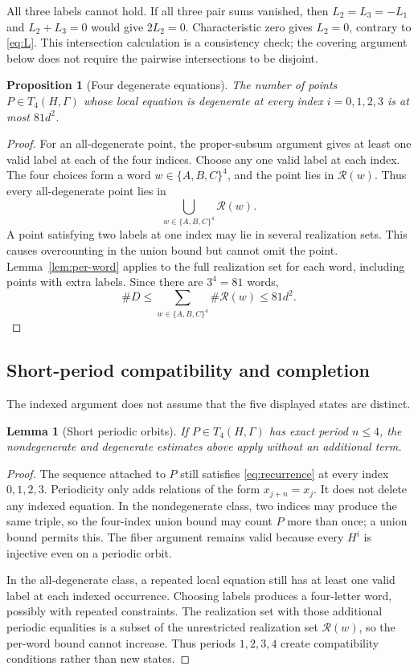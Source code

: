 \documentclass[11pt]{article}
\newtheorem{proposition}[theorem]{Proposition}
\newtheorem{lemma}[theorem]{Lemma}
\theoremstyle{definition}
\theoremstyle{remark}
\begin{document}
All three labels cannot hold.  If all three pair sums vanished, then
\(L_2=L_3=-L_1\) and \(L_2+L_3=0\) would give \(2L_2=0\).  Characteristic
zero gives \(L_2=0\), contrary to \eqref{eq:L}.  This intersection
calculation is a consistency check; the covering argument below does not
require the pairwise intersections to be disjoint.

\begin{proposition}[Four degenerate equations]\label{prop:degenerate}
The number of points \(P\in T_4(H,\Gamma)\) whose local equation is
degenerate at every index \(i=0,1,2,3\) is at most \(81d^2\).
\end{proposition}

\begin{proof}
For an all-degenerate point, the proper-subsum argument gives at least one
valid label at each of the four indices.  Choose any one valid label at each
index.  The four choices form a word \(w\in\{A,B,C\}^4\), and the point lies
in \(\mathcal R(w)\).  Thus every all-degenerate point lies in
\[
 \bigcup_{w\in\{A,B,C\}^4}\mathcal R(w).
\]
A point satisfying two labels at one index may lie in several realization
sets.  This causes overcounting in the union bound but cannot omit the point.
Lemma~\ref{lem:per-word} applies to the full realization set for each word,
including points with extra labels.  Since there are \(3^4=81\) words,
\[
 \#D
 \le
 \sum_{w\in\{A,B,C\}^4}\#\mathcal R(w)
 \le81d^2.
\]
\end{proof}

\subsection{Short-period compatibility and completion}

The indexed argument does not assume that the five displayed states are
distinct.

\begin{lemma}[Short periodic orbits]\label{lem:short-periods}
If \(P\in T_4(H,\Gamma)\) has exact period \(n\le4\), the nondegenerate and
degenerate estimates above apply without an additional term.
\end{lemma}

\begin{proof}
The sequence attached to \(P\) still satisfies
\eqref{eq:recurrence} at every index \(0,1,2,3\).  Periodicity only adds
relations of the form \(x_{j+n}=x_j\).  It does not delete any indexed
equation.  In the nondegenerate class, two indices may produce the same
triple, so the four-index union bound may count \(P\) more than once; a union
bound permits this.  The fiber argument remains valid because every
\(H^i\) is injective even on a periodic orbit.

In the all-degenerate class, a repeated local equation still has at least
one valid label at each indexed occurrence.  Choosing labels produces a
four-letter word, possibly with repeated constraints.  The realization set
with those additional periodic equalities is a subset of the unrestricted
realization set \(\mathcal R(w)\), so the per-word bound cannot increase.
Thus periods \(1,2,3,4\) create compatibility conditions rather than new
states.
\end{proof}
\end{document}
